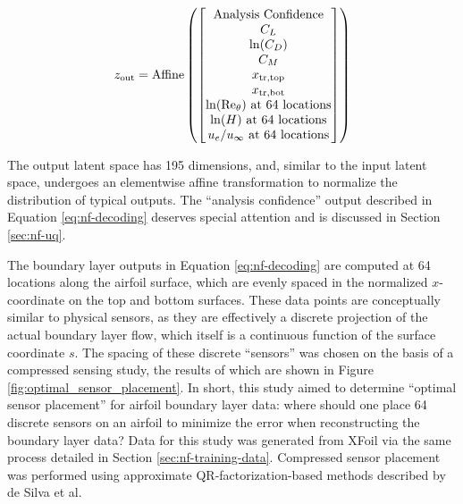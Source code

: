 \begin{equation}
    z_{\rm out} = \text{Affine}\left( \begin{bmatrix}
                                          \text{Analysis Confidence}               \\
                                          C_L                                      \\
                                          \ln(C_D)                                 \\
                                          C_M                                      \\
                                          x_{\rm tr, top}                          \\
                                          x_{\rm tr, bot}                          \\
                                          \ln(\rm Re_\theta) \text{ at 64 locations} \\
                                          \ln(H) \text{ at 64 locations}           \\
                                          u_e/u_\infty \text{ at 64 locations}     \\
    \end{bmatrix} \right)
    \label{eq:nf-decoding}
\end{equation}

The output latent space has 195 dimensions, and, similar to the input latent space, undergoes an elementwise affine transformation to normalize the distribution of typical outputs. The ``analysis confidence'' output described in Equation \ref{eq:nf-decoding} deserves special attention and is discussed in Section \ref{sec:nf-uq}.

The boundary layer outputs in Equation \ref{eq:nf-decoding} are computed at 64 locations along the airfoil surface, which are evenly spaced in the normalized $x$-coordinate on the top and bottom surfaces. These data points are conceptually similar to physical sensors, as they are effectively a discrete projection of the actual boundary layer flow, which itself is a continuous function of the surface coordinate $s$. The spacing of these discrete ``sensors'' was chosen on the basis of a compressed sensing study, the results of which are shown in Figure \ref{fig:optimal_sensor_placement}. In short, this study aimed to determine ``optimal sensor placement'' for airfoil boundary layer data: where should one place 64 discrete sensors on an airfoil to minimize the error when reconstructing the boundary layer data? Data for this study was generated from XFoil via the same process detailed in Section \ref{sec:nf-training-data}. Compressed sensor placement was performed using approximate QR-factorization-based methods described by de Silva et al. \cite{de_Silva2021}

